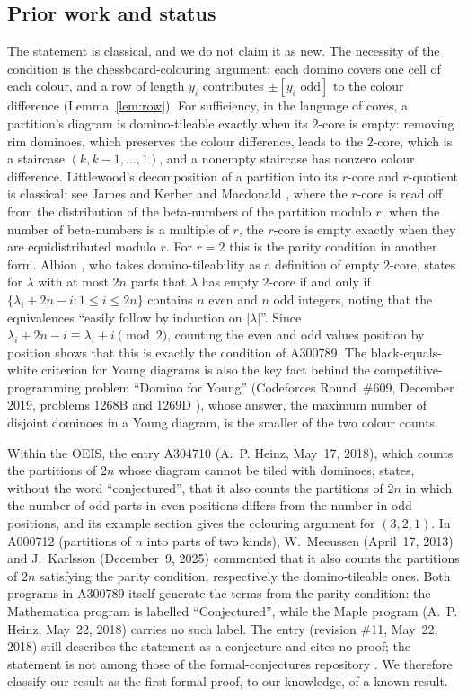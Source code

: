 \documentclass[11pt]{amsart}
\theoremstyle{plain}
\theoremstyle{definition}
\begin{document}
\subsection*{Prior work and status}
The statement is classical, and we do not claim it as new.
The necessity of the condition is the chessboard-colouring argument: each domino covers one cell of each colour, and a row of length $y_i$ contributes $\pm[y_i\text{ odd}]$ to the colour difference (Lemma~\ref{lem:row}).
For sufficiency, in the language of cores, a partition's diagram is domino-tileable exactly when its $2$-core is empty: removing rim dominoes, which preserves the colour difference, leads to the $2$-core, which is a staircase $(k,k-1,\dots,1)$, and a nonempty staircase has nonzero colour difference.
Littlewood's decomposition of a partition into its $r$-core and $r$-quotient \cite{Lit51} is classical; see James and Kerber \cite{JK81} and Macdonald \cite[Ch.~I, \S1, Ex.~8, pp.~12--15]{Mac95}, where the $r$-core is read off from the distribution of the beta-numbers of the partition modulo $r$; when the number of beta-numbers is a multiple of $r$, the $r$-core is empty exactly when they are equidistributed modulo $r$.
For $r=2$ this is the parity condition in another form.
Albion \cite[Lemma~2.1]{Alb24}, who takes domino-tileability as a definition of empty $2$-core, states for $\lambda$ with at most $2n$ parts that $\lambda$ has empty $2$-core if and only if $\{\lambda_i+2n-i: 1\le i\le 2n\}$ contains $n$ even and $n$ odd integers, noting that the equivalences ``easily follow by induction on $|\lambda|$''. Since $\lambda_i+2n-i\equiv\lambda_i+i\pmod 2$, counting the even and odd values position by position shows that this is exactly the condition of A300789.
The black-equals-white criterion for Young diagrams is also the key fact behind the competitive-programming problem ``Domino for Young'' (Codeforces Round~\#609, December 2019, problems 1268B and 1269D \cite{CF}), whose answer, the maximum number of disjoint dominoes in a Young diagram, is the smaller of the two colour counts.

Within the OEIS, the entry A304710 \cite{A304710} (A.~P. Heinz, May~17, 2018), which counts the partitions of $2n$ whose diagram cannot be tiled with dominoes, states, without the word ``conjectured'', that it also counts the partitions of $2n$ in which the number of odd parts in even positions differs from the number in odd positions, and its example section gives the colouring argument for $(3,2,1)$.
In A000712 \cite{A000712} (partitions of $n$ into parts of two kinds), W.~Meeussen (April~17, 2013) and J.~Karlsson (December~9, 2025) commented that it also counts the partitions of $2n$ satisfying the parity condition, respectively the domino-tileable ones.
Both programs in A300789 itself generate the terms from the parity condition: the Mathematica program is labelled ``Conjectured'', while the Maple program (A.~P. Heinz, May~22, 2018) carries no such label.
The entry (revision \#11, May~22, 2018) still describes the statement as a conjecture and cites no proof; the statement is not among those of the formal-conjectures repository \cite{FC}.
We therefore classify our result as the first formal proof, to our knowledge, of a known result.
\end{document}
